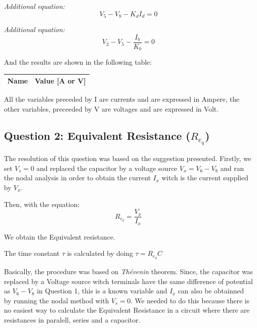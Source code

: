 \emph{Additional equation:}
\begin{equation}
     V_5 - V_8 - K_dI_d = 0
\end{equation}\par

\emph{Additional equation:}
\begin{equation}
     V_2 - V_5 - \frac{I_b}{K_b} = 0
\end{equation}\par

And the results are shown in the following table:

\begin{center}
  \begin{tabular}{ | c | c | }
    \hline    
    {\bf Name} & {\bf Value [A or V]} \\ \hline
    
    \hline
  \end{tabular}
\end{center}
All the variables preceded by I are currents and are expressed in Ampere, the other variables, preceeded by V are voltages and are expressed in Volt.



\subsection{Question 2: Equivalent Resistance ($R_{e_q}$)}
The resolution of this question was based on the suggestion presented. Firstly, we set $V_s =0$ and replaced the capacitor by a voltage source $V_x = V_6 - V_8$ and ran the nodal analysis in order to obtain the current $I_x$ witch is the current supplied by $V_x$.\par
Then, with the equation: 
\begin{equation}
     R_{e_q} = \frac{V_x}{I_x}
\end{equation}\par
We obtain the Equivalent resistance. \par 
The time constant $\tau$ is calculated by doing $\tau=R_{e_q}C$\par
Basically, the procedure was based on \emph{Thévenin} theorem. Since, the capacitor was replaced by a Voltage source witch terminals have the same difference of potential as $V_6 - V_8$ in Question 1, this is a known variable and $I_x$ can also be obtainned by running the nodal method with $V_s = 0$. We needed to do this because there is no easiest way to calculate the Equivalent Resistance in a circuit where there are resistances in paralell, series and a capacitor.

